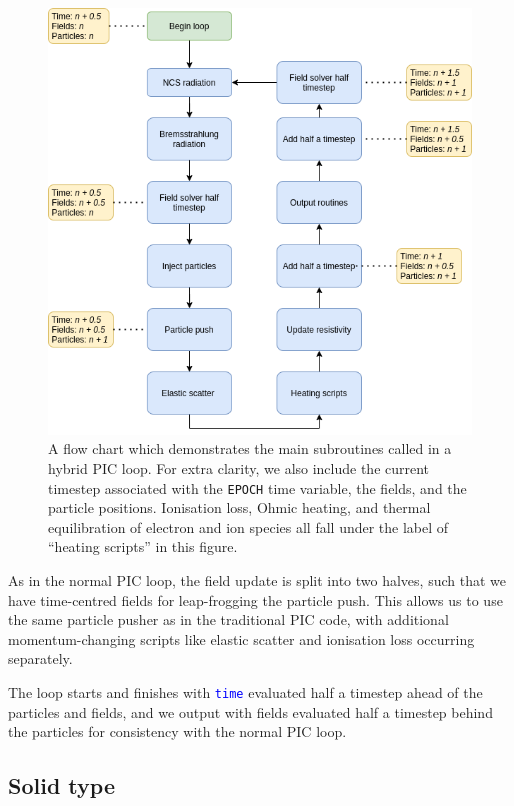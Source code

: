 \documentclass[12pt]{article}
\numberwithin{equation}{section}
\begin{document}
\begin{figure}
\centering
\includegraphics[width=1\linewidth]{Figures/flowchart.png}
\caption{A flow chart which demonstrates the main subroutines called in a hybrid PIC loop. For extra clarity, we also include the current timestep associated with the \texttt{EPOCH} time variable, the fields, and the particle positions. Ionisation loss, Ohmic heating, and thermal equilibration of electron and ion species all fall under the label of ``heating scripts'' in this figure.}
\label{fig:flowchart_PIC_loop}
\end{figure}

As in the normal PIC loop, the field update is split into two halves, such that we have time-centred fields for leap-frogging the particle push. This allows us to use the same particle pusher as in the traditional PIC code, with additional momentum-changing scripts like elastic scatter and ionisation loss occurring separately. 

The loop starts and finishes with \textcolor{blue}{\texttt{time}} evaluated half a timestep ahead of the particles and fields, and we output with fields evaluated half a timestep behind the particles for consistency with the normal PIC loop.

\subsection{Solid type} \label{sec:code:solid}
\end{document}
